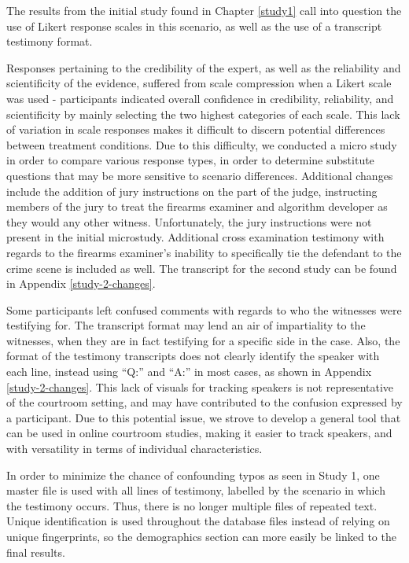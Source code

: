 \documentclass[print]{nuthesis}
\begin{document}
The results from the initial study found in Chapter \ref{study1} call into question the use of Likert response scales in this scenario, as well as the use of a transcript testimony format.

Responses pertaining to the credibility of the expert, as well as the reliability and scientificity of the evidence, suffered from scale compression when a Likert scale was used - participants indicated overall confidence in credibility, reliability, and scientificity by mainly selecting the two highest categories of each scale.
This lack of variation in scale responses makes it difficult to discern potential differences between treatment conditions.
Due to this difficulty, we conducted a micro study in order to compare various response types, in order to determine substitute questions that may be more sensitive to scenario differences.
Additional changes include the addition of jury instructions on the part of the judge, instructing members of the jury to treat the firearms examiner and algorithm developer as they would any other witness.
Unfortunately, the jury instructions were not present in the initial microstudy.
Additional cross examination testimony with regards to the firearms examiner's inability to specifically tie the defendant to the crime scene is included as well.
The transcript for the second study can be found in Appendix \ref{study-2-changes}.

Some participants left confused comments with regards to who the witnesses were testifying for.
The transcript format may lend an air of impartiality to the witnesses, when they are in fact testifying for a specific side in the case.
Also, the format of the testimony transcripts does not clearly identify the speaker with each line, instead using ``Q:'' and ``A:'' in most cases, as shown in Appendix \ref{study-2-changes}.
This lack of visuals for tracking speakers is not representative of the courtroom setting, and may have contributed to the confusion expressed by a participant.
Due to this potential issue, we strove to develop a general tool that can be used in online courtroom studies, making it easier to track speakers, and with versatility in terms of individual characteristics.

In order to minimize the chance of confounding typos as seen in Study 1, one master file is used with all lines of testimony, labelled by the scenario in which the testimony occurs.
Thus, there is no longer multiple files of repeated text.
Unique identification is used throughout the database files instead of relying on unique fingerprints, so the demographics section can more easily be linked to the final results.
\end{document}
